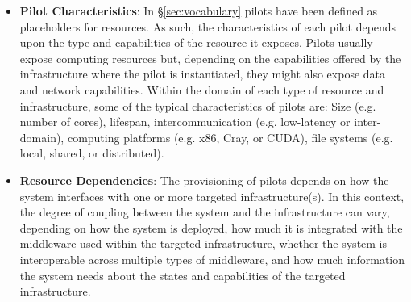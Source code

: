 \documentclass{sig-alternate}
\begin{document}

\begin{itemize}

\item \textbf{Pilot Characteristics}: In \S\ref{sec:vocabulary} pilots
  have been defined as placeholders for resources. As such, the
  characteristics of each pilot depends upon the type and capabilities
  of the resource it exposes.  Pilots usually expose computing
  resources but, depending on the capabilities offered by the
  infrastructure where the pilot is instantiated, they might also
  expose data and network capabilities. Within the domain of each type
  of resource and infrastructure, some of the typical characteristics
  of pilots are: Size (e.g. number of cores), lifespan,
  intercommunication (e.g. low-latency or inter-domain), computing
  platforms (e.g. x86, Cray, or CUDA), file systems (e.g. local,
  shared, or distributed).

\item \textbf{Resource Dependencies}: The provisioning of pilots
  depends on how the \pilotjob system interfaces with one or more
  targeted infrastructure(s). In this context, the degree of coupling
  between the \pilotjob system and the infrastructure can vary,
  depending on how the \pilotjob system is deployed, how much it is
  integrated with the middleware used within the targeted
  infrastructure, whether the \pilotjob system is interoperable across
  multiple types of middleware, and how much information the \pilotjob
  system needs about the states and capabilities of the targeted
  infrastructure.


\end{itemize}
\end{document}
